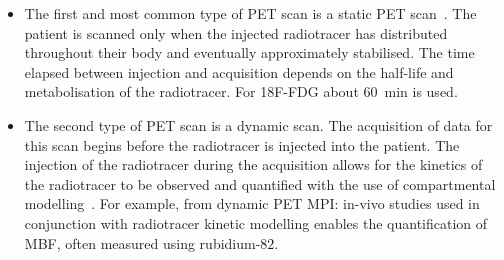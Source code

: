                 \begin{itemize}
                    \item The first and most common type of \gls{PET} scan is a static \gls{PET} scan~. The patient is scanned only when the injected radiotracer has distributed throughout their body and eventually approximately stabilised. %
                    The time elapsed between injection and acquisition depends on the half-life and metabolisation of the radiotracer. For \gls{18F-FDG} about \SI{60}{\minute} is used.
                    
                    \item The second type of \gls{PET} scan is a dynamic scan. The acquisition of data for this scan begins before the radiotracer is injected into the patient. The injection of the radiotracer during the acquisition allows for the kinetics of the radiotracer to be observed and quantified with the use of compartmental modelling~. For example, from dynamic \gls{PET} \gls{MPI}: %
                    in-vivo studies used in conjunction with radiotracer kinetic modelling enables the quantification of \gls{MBF}, often measured using rubidium-$82$. %
                \end{itemize}
            
